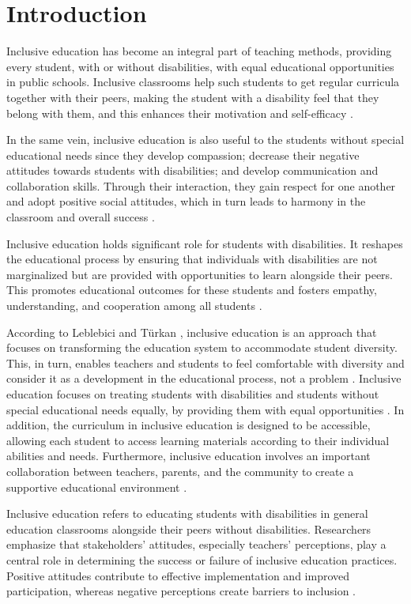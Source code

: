 \documentclass[10pt]{NSP1}
\begin{document}
	\section{Introduction}

	Inclusive education has become an integral part of teaching methods, providing every student, with or without disabilities, with equal educational opportunities in public schools. Inclusive classrooms help such students to get regular curricula together with their peers, making the student with a disability feel that they belong with them, and this enhances their motivation and self-efficacy \cite{ref1}.

	In the same vein, inclusive education is also useful to the students without special educational needs since they develop compassion; decrease their negative attitudes towards students with disabilities; and develop communication and collaboration skills. Through their interaction, they gain respect for one another and adopt positive social attitudes, which in turn leads to harmony in the classroom and overall success \cite{ref2}.

	Inclusive education holds significant role for students with disabilities. It reshapes the educational process by ensuring that individuals with disabilities are not marginalized but are provided with opportunities to learn alongside their peers. This promotes educational outcomes for these students and fosters empathy, understanding, and cooperation among all students \cite{ref3}.

	According to Leblebici and T\"{u}rkan \cite{ref4}, inclusive education is an approach that focuses on transforming the education system to accommodate student diversity. This, in turn, enables teachers and students to feel comfortable with diversity and consider it as a development in the educational process, not a problem \cite{ref5}. Inclusive education focuses on treating students with disabilities and students without special educational needs equally, by providing them with equal opportunities \cite{ref6}. In addition, the curriculum in inclusive education is designed to be accessible, allowing each student to access learning materials according to their individual abilities and needs. Furthermore, inclusive education involves an important collaboration between teachers, parents, and the community to create a supportive educational environment \cite{ref7}.

	Inclusive education refers to educating students with disabilities in general education classrooms alongside their peers without disabilities. Researchers emphasize that stakeholders' attitudes, especially teachers' perceptions, play a central role in determining the success or failure of inclusive education practices. Positive attitudes contribute to effective implementation and improved participation, whereas negative perceptions create barriers to inclusion \cite{ref8}.
\end{document}
